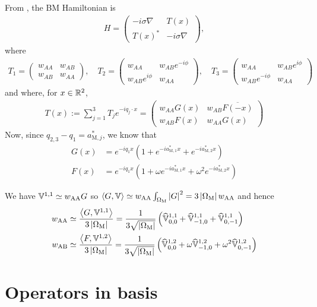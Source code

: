 \documentclass[11pt,a4paper,reqno,french,tikz]{amsart}
\newcommand{\pa}[1]{\left( #1 \right)} %
\newcommand{\ab}[1]{\left|#1\right|} %
\newcommand{\ps}[1]{\left< #1 \right>} %
\newcommand{\na}{\nabla} %
\newcommand{\f}[2]{\frac{#1}{#2}} %
\newcommand{\ind}[1]{_{\textup{#1}}} %
\newcommand{\mat}[1]{\begin{pmatrix} #1 \end{pmatrix}} %
\newcommand{\bbV}{\mathbb{V}}
\def\bbV{{\mathbb V}}
\newcommand{\sqom}{\sqrt{\ab{\Omega\ind{M}}}}
\begin{document}
From \cite{BecEmbWitZwo21}, the BM Hamiltonian is
\begin{align*}
	H = \mat{-i\sigma \na & T(x) \\ T(x)^* & -i \sigma \na},
\end{align*}
where
\begin{align*}
\boxed{T_1 = \mat{w_{AA} & w_{AB} \\ w_{AB} & w_{AA}}, \quad  T_2 = \mat{w_{AA} &  w_{AB}e^{-i\phi} \\  w_{AB}e^{i\phi} & w_{AA}}, \quad T_3 = \mat{w_{AA} &  w_{AB}e^{i\phi} \\  w_{AB}e^{-i\phi} & w_{AA}}}
\end{align*}
and where, for $x \in \mathbb{R}^2$,
\begin{align*}
	T(x) := \sum_{j=1}^3 T_j e^{-iq_j \cdot x} = \mat{w_{AA} G(x) & w_{AB} \overline{F(-x)} \\ w_{AB} F(x) & w_{AA} G(x)}
\end{align*}
Now, since $q_{2,3} - q_1 = a^*_{\text{M},j}$, we know that
\begin{align*}
G(x) &= e^{-iq_1 x} \pa{1 + e^{-i a_{\text{M} ,1}^* x} +e^{-i a_{\text{M},2}^* x}} \\
F(x) &= e^{-iq_1 x} \pa{1 + \omega e^{-i a_{\text{M} ,1}^* x} + \omega^2 e^{-i a_{\text{M},2}^* x}}
\end{align*}

We have $\bbV^{1,1} \simeq w\ind{AA} G$ so $\ps{G,\bbV} \simeq w\ind{AA} \int_{\Omega\ind{M}} \ab{G}^2 = 3 \ab{\Omega\ind{M}} w\ind{AA}$ and hence 
\begin{align*}
	w\ind{AA} &\simeq \f{\ps{G,\bbV^{1,1}}}{3 \ab{\Omega\ind{M}}} = \f{1}{3 \sqom}\pa{\widehat{\bbV}^{1,1}_{0,0} +\widehat{\bbV}^{1,1}_{-1,0} + \widehat{\bbV}^{1,1}_{0,-1}} \\
	w\ind{AB} &\simeq \f{\ps{F,\bbV^{1,2}}}{3 \ab{\Omega\ind{M}}} = \f{1}{3 \sqom}\pa{\widehat{\bbV}^{1,2}_{0,0} + \omega\widehat{\bbV}^{1,2}_{-1,0} + \omega^2 \widehat{\bbV}^{1,2}_{0,-1}}
\end{align*}

\section{Operators in basis}%
\label{sec:operators_in_basis}
\end{document}
